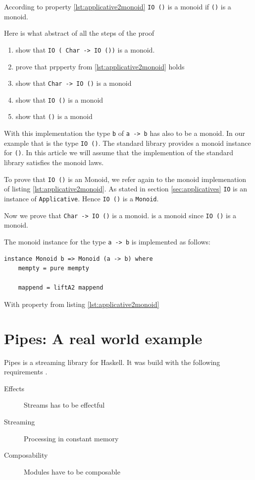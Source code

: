 \documentclass[twoside, a4paper, 12pt]{article}
\begin{document}
According to property \ref{lst:applicative2monoid} \verb|IO ()| is a monoid if \verb|()| is a monoid.

Here is what abstract of all the steps of the proof
\begin{enumerate}
\item show that  \verb|IO ( Char -> IO ())| is a monoid.
\item prove that prpperty from \ref{lst:applicative2monoid} holds
\item show that \verb|Char -> IO ()| is a monoid
\item show that \verb|IO ()| is a monoid
\item show that \verb|()| is a monoid
\end{enumerate}

With this implementation the type \verb|b| of \verb|a -> b| has also to be a monoid. In our example that is the type \verb|IO ()|. The standard library provides a monoid instance for \verb|()|. In this article we will assume that the implemention of the standard library satisfies the monoid laws.

To prove that \verb|IO ()| is an Monoid, we refer again to the monoid implemenation of listing \ref{lst:applicative2monoid}. As stated in section \ref{sec:applicatives} \verb|IO| is an instance of \verb|Applicative|. Hence \verb|IO ()| is a \verb|Monoid|.

Now we prove that \verb|Char -> IO ()| is a monoid.  is a monoid since \verb|IO ()| is a monoid.

The monoid instance for the type \verb|a -> b| is implemented as follows:
\begin{verbatim}
instance Monoid b => Monoid (a -> b) where
    mempty = pure mempty

    mappend = liftA2 mappend
\end{verbatim}


With property from listing \ref{lst:applicative2monoid} 

\section{Pipes: A real world example}
\label{sec:pipes}

Pipes is a streaming library for Haskell. It was build with the following requirements \cite{gonzales13}.
\begin{description}
\item[Effects] Streams has to be effectful
\item[Streaming] Processing in constant memory
\item[Composability] Modules have to be composable
\end{description}
\end{document}
